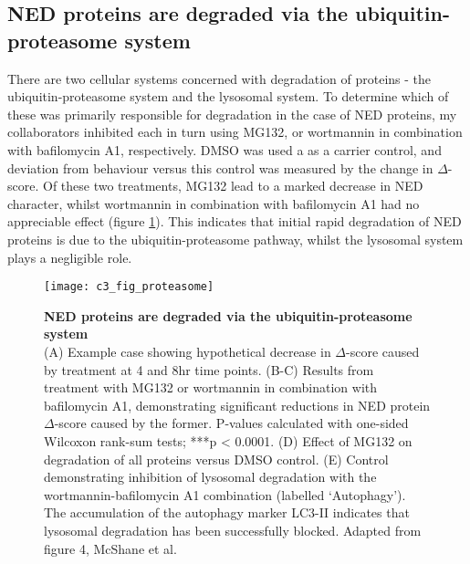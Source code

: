 \documentclass[a4paper,11pt,twoside,openright]{scrbook}
\begin{document}
\subsection{NED proteins are degraded via the ubiquitin-proteasome system}
There are two cellular systems concerned with degradation of proteins - the ubiquitin-proteasome system and the lysosomal system. To determine which of these was primarily responsible for degradation in the case of NED proteins, my collaborators inhibited each in turn using MG132, or wortmannin in combination with bafilomycin A1, respectively. DMSO was used a as a carrier control, and deviation from behaviour versus this control was measured by the change in $\Delta$-score. Of these two treatments, MG132 lead to a marked decrease in NED character, whilst wortmannin in combination with bafilomycin A1 had no appreciable effect (figure \ref{figure:proteasome}). This indicates that initial rapid degradation of NED proteins is due to the ubiquitin-proteasome pathway, whilst the lysosomal system plays a negligible role.

\begin{figure}[h]
    \texttt{[image: c3\_fig\_proteasome]}
    \caption[NED proteins are degraded via the ubiquitin-proteasome system]{\sffamily \textbf{NED proteins are degraded via the ubiquitin-proteasome system} \\ \small (A) Example case showing hypothetical decrease in $\Delta$-score caused by treatment at 4 and 8hr time points. (B-C) Results from treatment with MG132 or wortmannin in combination with bafilomycin A1, demonstrating significant reductions in NED protein $\Delta$-score caused by the former. P-values calculated with one-sided Wilcoxon rank-sum tests; ***p < 0.0001. (D) Effect of MG132 on degradation of all proteins versus DMSO control. (E) Control demonstrating inhibition of lysosomal degradation with the wortmannin-bafilomycin A1 combination (labelled `Autophagy'). The accumulation of the autophagy marker LC3-II indicates that lysosomal degradation has been successfully blocked. Adapted from figure 4, McShane et al.\cite{McShane2016}}
    \label{figure:proteasome}
\end{figure}
\end{document}
